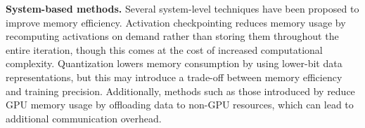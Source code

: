 \textbf{System-based methods.} 
Several system-level techniques have been proposed to improve memory efficiency. Activation checkpointing \citep{chen2016training} reduces memory usage by recomputing activations on demand rather than storing them throughout the entire iteration, though this comes at the cost of increased computational complexity. Quantization \citep{dettmers2023qlora} lowers memory consumption by using lower-bit data representations, but this may introduce a trade-off between memory efficiency and training precision. Additionally, methods such as those introduced by \citet{ren2021zero, zhang2023g10} reduce GPU memory usage by offloading data to non-GPU resources, which can lead to additional communication overhead.